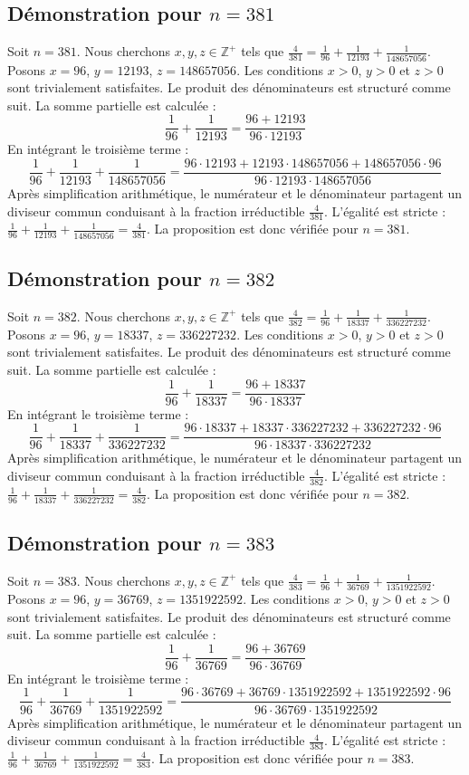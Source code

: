 \documentclass[11pt,a4paper]{article}
\begin{document}
\subsection{Démonstration pour $n = 381$}
Soit $n = 381$. Nous cherchons $x, y, z \in \mathbb{Z}^{+}$ tels que $\frac{4}{381} = \frac{1}{96} + \frac{1}{12193} + \frac{1}{148657056}$.
Posons $x = 96$, $y = 12193$, $z = 148657056$.
Les conditions $x > 0$, $y > 0$ et $z > 0$ sont trivialement satisfaites.
Le produit des dénominateurs est structuré comme suit. La somme partielle est calculée :
$$ \frac{1}{96} + \frac{1}{12193} = \frac{96+12193}{96 \cdot 12193} $$
En intégrant le troisième terme :
$$ \frac{1}{96} + \frac{1}{12193} + \frac{1}{148657056} = \frac{96 \cdot 12193 + 12193 \cdot 148657056 + 148657056 \cdot 96}{96 \cdot 12193 \cdot 148657056} $$
Après simplification arithmétique, le numérateur et le dénominateur partagent un diviseur commun conduisant à la fraction irréductible $\frac{4}{381}$.
L'égalité est stricte : $\frac{1}{96} + \frac{1}{12193} + \frac{1}{148657056} = \frac{4}{381}$.
La proposition est donc vérifiée pour $n = 381$.
\subsection{Démonstration pour $n = 382$}
Soit $n = 382$. Nous cherchons $x, y, z \in \mathbb{Z}^{+}$ tels que $\frac{4}{382} = \frac{1}{96} + \frac{1}{18337} + \frac{1}{336227232}$.
Posons $x = 96$, $y = 18337$, $z = 336227232$.
Les conditions $x > 0$, $y > 0$ et $z > 0$ sont trivialement satisfaites.
Le produit des dénominateurs est structuré comme suit. La somme partielle est calculée :
$$ \frac{1}{96} + \frac{1}{18337} = \frac{96+18337}{96 \cdot 18337} $$
En intégrant le troisième terme :
$$ \frac{1}{96} + \frac{1}{18337} + \frac{1}{336227232} = \frac{96 \cdot 18337 + 18337 \cdot 336227232 + 336227232 \cdot 96}{96 \cdot 18337 \cdot 336227232} $$
Après simplification arithmétique, le numérateur et le dénominateur partagent un diviseur commun conduisant à la fraction irréductible $\frac{4}{382}$.
L'égalité est stricte : $\frac{1}{96} + \frac{1}{18337} + \frac{1}{336227232} = \frac{4}{382}$.
La proposition est donc vérifiée pour $n = 382$.
\subsection{Démonstration pour $n = 383$}
Soit $n = 383$. Nous cherchons $x, y, z \in \mathbb{Z}^{+}$ tels que $\frac{4}{383} = \frac{1}{96} + \frac{1}{36769} + \frac{1}{1351922592}$.
Posons $x = 96$, $y = 36769$, $z = 1351922592$.
Les conditions $x > 0$, $y > 0$ et $z > 0$ sont trivialement satisfaites.
Le produit des dénominateurs est structuré comme suit. La somme partielle est calculée :
$$ \frac{1}{96} + \frac{1}{36769} = \frac{96+36769}{96 \cdot 36769} $$
En intégrant le troisième terme :
$$ \frac{1}{96} + \frac{1}{36769} + \frac{1}{1351922592} = \frac{96 \cdot 36769 + 36769 \cdot 1351922592 + 1351922592 \cdot 96}{96 \cdot 36769 \cdot 1351922592} $$
Après simplification arithmétique, le numérateur et le dénominateur partagent un diviseur commun conduisant à la fraction irréductible $\frac{4}{383}$.
L'égalité est stricte : $\frac{1}{96} + \frac{1}{36769} + \frac{1}{1351922592} = \frac{4}{383}$.
La proposition est donc vérifiée pour $n = 383$.
\end{document}
